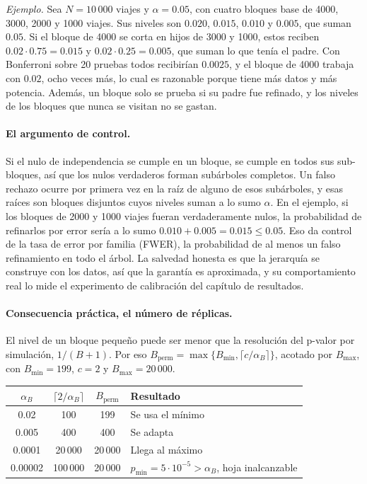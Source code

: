 \documentclass[11pt,a4paper]{article}
\begin{document}
\emph{Ejemplo.} Sea $N=10\,000$ viajes y $\alpha=0.05$, con cuatro bloques base de
4000, 3000, 2000 y 1000 viajes. Sus niveles son $0.020$, $0.015$, $0.010$ y $0.005$,
que suman $0.05$. Si el bloque de 4000 se corta en hijos de 3000 y 1000, estos
reciben $0.02\cdot0.75=0.015$ y $0.02\cdot0.25=0.005$, que suman lo que tenía el
padre. Con Bonferroni sobre 20 pruebas todos recibirían $0.0025$, y el bloque de 4000
trabaja con $0.02$, ocho veces más, lo cual es razonable porque tiene más datos y más
potencia. Además, un bloque solo se prueba si su padre fue refinado, y los niveles de
los bloques que nunca se visitan no se gastan.

\paragraph{El argumento de control.} Si el nulo de independencia se cumple en un
bloque, se cumple en todos sus sub-bloques, así que los nulos verdaderos forman
subárboles completos. Un falso rechazo ocurre por primera vez en la raíz de alguno de
esos subárboles, y esas raíces son bloques disjuntos cuyos niveles suman a lo sumo
$\alpha$. En el ejemplo, si los bloques de 2000 y 1000 viajes fueran verdaderamente
nulos, la probabilidad de refinarlos por error sería a lo sumo
$0.010+0.005=0.015\le0.05$. Eso da control de la tasa de error por familia (FWER),
la probabilidad de al menos un falso refinamiento en todo el árbol. La salvedad
honesta es que la jerarquía se construye con los datos, así que la garantía es
aproximada, y su comportamiento real lo mide el experimento de calibración del
capítulo de resultados.

\paragraph{Consecuencia práctica, el número de réplicas.} El nivel de un bloque
pequeño puede ser menor que la resolución del p-valor por simulación, $1/(B+1)$. Por
eso $B_{\mathrm{perm}}=\max\{B_{\min},\lceil c/\alpha_B\rceil\}$, acotado por
$B_{\max}$, con $B_{\min}=199$, $c=2$ y $B_{\max}=20\,000$.

\begin{center}
\small
\begin{tabular}{@{}cccl@{}}
\toprule
$\alpha_B$ & $\lceil2/\alpha_B\rceil$ & $B_{\mathrm{perm}}$ & Resultado \\
\midrule
0.02 & 100 & 199 & Se usa el mínimo \\
0.005 & 400 & 400 & Se adapta \\
0.0001 & 20\,000 & 20\,000 & Llega al máximo \\
0.00002 & 100\,000 & 20\,000 & $p_{\min}=5\cdot10^{-5}>\alpha_B$, hoja inalcanzable \\
\bottomrule
\end{tabular}
\end{center}
\end{document}
